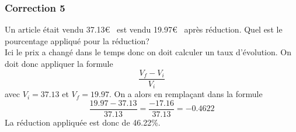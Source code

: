 \documentclass[15pt, mathserif]{beamer}
\begin{document}
\begin{frame}
\vspace{-10mm}
	\frametitle{Correction 5}
Un article était vendu 37.13\euro ~ est vendu 19.97\euro ~ après réduction. Quel est le pourcentage appliqué pour la réduction? \\ Ici le prix a changé dans le temps donc on doit calculer un taux d'évolution. On doit donc appliquer la formule $$\dfrac{V_f-V_i}{V_i}$$ avec $V_i =37.13$ et $V_f=19.97$. On a alors en remplaçant dans la formule $$\dfrac{19.97-37.13}{37.13}= \dfrac{-17.16}{37.13}=-0.4622$$ La réduction appliquée est donc de 46.22\%.\end{frame}
\end{document}
